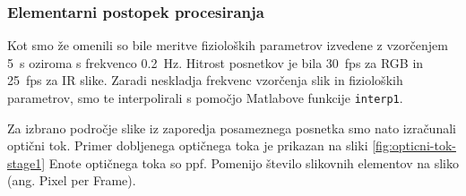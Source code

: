 \subsubsection{Elementarni postopek procesiranja}\label{sec:elementarni-postopek}
Kot smo že omenili so bile meritve fizioloških parametrov izvedene z vzorčenjem \SI{5}{\s} oziroma s frekvenco \SI{0.2}{\hertz}. Hitrost posnetkov je bila \SI{30}{fps} za RGB in \SI{25}{fps} za IR slike. Zaradi neskladja frekvenc vzorčenja slik in fizioloških parametrov, smo te interpolirali s pomočjo Matlabove funkcije \texttt{interp1}.
 
Za izbrano področje slike iz zaporedja posameznega posnetka smo nato izračunali optični tok. Primer dobljenega optičnega toka je prikazan na sliki \ref{fig:opticni-tok-stage1} Enote optičnega toka so \si{ppf}. Pomenijo število slikovnih elementov na sliko (ang. Pixel per Frame).


